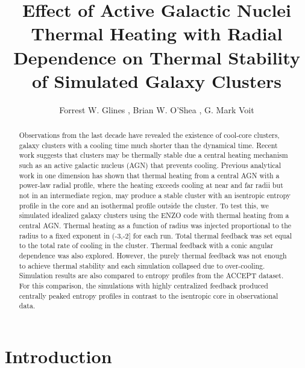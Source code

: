 \documentclass[iop,apjl, twocolappendix]{emulateapj}   %
\begin{document}
\title{Effect of Active Galactic Nuclei Thermal Heating with Radial Dependence on Thermal Stability of Simulated Galaxy Clusters}

\author{
  Forrest W. Glines , Brian W. O'Shea , G. Mark Voit
}


\label{firstpage}

\begin{abstract}
  Observations from the last decade have revealed the existence of cool-core
  clusters, galaxy clusters with a cooling time  much shorter than the
  dynamical time. Recent work suggests that clusters may be thermally stable
  due a central heating mechanism such as an active galactic nucleus (AGN) that
  prevents cooling. Previous analytical work in one dimension has shown that
  thermal heating from a central AGN with a power-law radial profile, where the
  heating exceeds cooling at near and far radii but not in an intermediate
  region, may produce a stable cluster with an isentropic entropy profile in
  the core and an isothermal profile outside the cluster. To test this, we
  simulated idealized galaxy clusters using the ENZO code with thermal heating
  from a central AGN. Thermal heating as a function of radius was injected
  proportional to the radius to a fixed exponent in (-3,-2] for each run. Total
  thermal feedback was set equal to the total rate of cooling in the cluster.
  Thermal feedback with a conic angular dependence was also explored.  However,
  the purely thermal feedback was not enough to achieve thermal stability and
  each simulation collapsed due to over-cooling. Simulation results are also
  compared to entropy profiles from the ACCEPT dataset. For this comparison,
  the simulations with highly centralized feedback produced centrally peaked
  entropy profiles in contrast to the isentropic core in observational data.
\end{abstract}

\keywords{}

\section{Introduction}
\label{sec:introduction}
\end{document}

